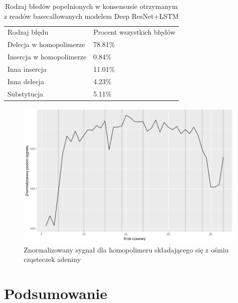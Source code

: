 \documentclass[a4paper,11pt,twoside]{report}
\theoremstyle{definition}
\begin{document}
\begin{table}[]
	\begin{tabular}{ll}
		Rodzaj błędu             & Procent wszystkich błędów \\
		Delecja w homopolimerze  & 78.81\%                   \\
		Insercja w homopolimerze & 0.84\%                    \\
		Inna insercja            & 11.01\%                   \\
		Inna delecja             & 4.23\%                    \\
		Substytucja              & 5.11\%                   
	\end{tabular}
	\caption{Rodzaj błedów popełnionych w konsensusie otrzymanym z readów basecallowanych modelem Deep ResNet+LSTM}
	\label{table:errors}
\end{table}

\begin{figure}[h!]
	\centering
	\includegraphics[scale=0.8]{homopolymer}
	\caption{Znormalizowany sygnał dla homopolimeru składającego się z ośmiu cząsteczek adeniny }
	\label{fig:homopolymer}
\end{figure}

\chapter{Podsumowanie}
\end{document}
